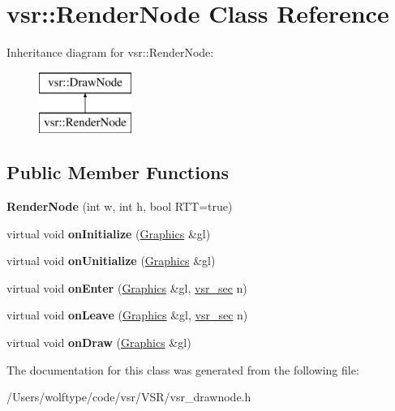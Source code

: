 \hypertarget{classvsr_1_1_render_node}{\section{vsr\-:\-:Render\-Node Class Reference}
\label{classvsr_1_1_render_node}
}
Inheritance diagram for vsr\-:\-:Render\-Node\-:\begin{figure}[H]
\begin{center}
\leavevmode
\includegraphics[height=2.000000cm]{classvsr_1_1_render_node}
\end{center}
\end{figure}
\subsection*{Public Member Functions}
\begin{DoxyCompactItemize}
\item 
\hypertarget{classvsr_1_1_render_node_af596de0265902c8a277de6771f97f058}{{\bfseries Render\-Node} (int w, int h, bool R\-T\-T=true)}\label{classvsr_1_1_render_node_af596de0265902c8a277de6771f97f058}

\item 
\hypertarget{classvsr_1_1_render_node_a5a5cdc0afb574f0e0ae16ab6fedaf721}{virtual void {\bfseries on\-Initialize} (\hyperlink{classvsr_1_1_graphics}{Graphics} \&gl)}\label{classvsr_1_1_render_node_a5a5cdc0afb574f0e0ae16ab6fedaf721}

\item 
\hypertarget{classvsr_1_1_render_node_abc7e3658ab50f80898578d1265ec9abe}{virtual void {\bfseries on\-Unitialize} (\hyperlink{classvsr_1_1_graphics}{Graphics} \&gl)}\label{classvsr_1_1_render_node_abc7e3658ab50f80898578d1265ec9abe}

\item 
\hypertarget{classvsr_1_1_render_node_adbb7b5ace9c5fbedd43e3a2184fbcb79}{virtual void {\bfseries on\-Enter} (\hyperlink{classvsr_1_1_graphics}{Graphics} \&gl, \hyperlink{classvsr_1_1vsr__sec}{vsr\-\_\-sec} n)}\label{classvsr_1_1_render_node_adbb7b5ace9c5fbedd43e3a2184fbcb79}

\item 
\hypertarget{classvsr_1_1_render_node_ae7c4299ab24da61662eaa28efcffbb31}{virtual void {\bfseries on\-Leave} (\hyperlink{classvsr_1_1_graphics}{Graphics} \&gl, \hyperlink{classvsr_1_1vsr__sec}{vsr\-\_\-sec} n)}\label{classvsr_1_1_render_node_ae7c4299ab24da61662eaa28efcffbb31}

\item 
\hypertarget{classvsr_1_1_render_node_a03cd1d42bdb7f211eb3f6f83bd6c0b0a}{virtual void {\bfseries on\-Draw} (\hyperlink{classvsr_1_1_graphics}{Graphics} \&gl)}\label{classvsr_1_1_render_node_a03cd1d42bdb7f211eb3f6f83bd6c0b0a}

\end{DoxyCompactItemize}


The documentation for this class was generated from the following file\-:\begin{DoxyCompactItemize}
\item 
/\-Users/wolftype/code/vsr/\-V\-S\-R/vsr\-\_\-drawnode.\-h\end{DoxyCompactItemize}
